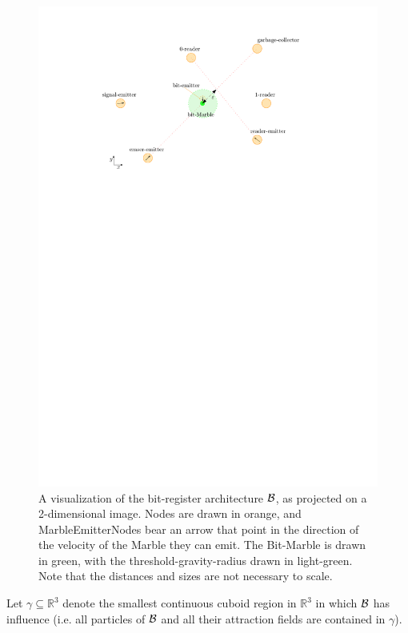 \begin{figure}
    \centering
    \includegraphics{figures/bit_base.pdf}
    \caption{A visualization of the bit-register architecture $\mathcal{B}$, as projected on a 2-dimensional image. Nodes are drawn in orange, and MarbleEmitterNodes bear an arrow that point in the direction of the velocity of the Marble they can emit. The Bit-Marble is drawn in green, with the threshold-gravity-radius drawn in light-green. Note that the distances and sizes are not necessary to scale.}
    \label{fig:bit_architecture}
\end{figure}

Let $\gamma \subseteq \mathbb{R}^3$ denote the smallest continuous cuboid region in $\mathbb{R}^3$ in which $\mathcal{B}$ has influence (i.e. all particles of $\mathcal{B}$ and all their attraction fields are contained in $\gamma$). 

